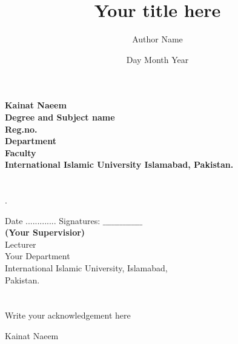 \documentclass[12pt,a4paper, openany]{report}
\begin{document}
\title{Your title here}
\author{Author Name}
\date{Day Month Year}



\chapter*{}
\begin{flushleft}
\textbf{Kainat Naeem}\\
\textbf{Degree and Subject name}\\
\textbf{Reg.no.}\\
\textbf{Department }\\
\textbf{Faculty}\\
\textbf{International Islamic University Islamabad, Pakistan.}\\
\end{flushleft}
\chapter*{ }
.\\ \begin{flushright}
Date .............  \hspace{6.5cm}  Signatures: $\_\_\_\_\_\_\_\_\_\_\_\_\_\_$ \\
 \textbf{(Your Supervisior)}\\
Lecturer \\
Your Department \\
International  Islamic  University, Islamabad,\\
Pakistan.\\
\end{flushright}

\chapter*{}
Write your acknowledgement here

\begin{flushright}
    Kainat Naeem
\end{flushright}
  {%
  }
 
\end{document}
